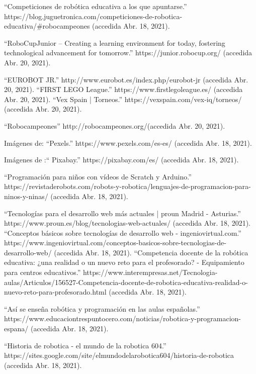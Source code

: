 \begin{thebibliography}{69}
	``Competiciones de robótica educativa a los que apuntarse.” https://blog.juguetronica.com/competiciones-de-robotica-educativa/\#robocampeones (accedida Abr. 18, 2021).

 ``RoboCupJunior – Creating a learning environment for today, fostering technological advancement for tomorrow.” https://junior.robocup.org/ (accedida Abr. 20, 2021).

	``EUROBOT JR.” http://www.eurobot.es/index.php/eurobot-jr (accedida Abr. 20, 2021).
 ``FIRST LEGO League.” https://www.firstlegoleague.es/ (accedida Abr. 20, 2021).
 ``Vex Spain | Torneos.” https://vexspain.com/vex-iq/torneos/ (accedida Abr. 20, 2021).

 ``Robocampeones”
http://robocampeones.org/(accedida Abr. 20, 2021).

 Imágenes de:	``Pexels.” https://www.pexels.com/es-es/ (accedida Abr. 18, 2021).

 Imágenes de :`` Pixabay.” https://pixabay.com/es/ (accedida Abr. 18, 2021).

\bibitem{}	``Programación para niños con vídeos de Scratch y Arduino.” https://revistaderobots.com/robots-y-robotica/lenguajes-de-programacion-para-ninos-y-ninas/ (accedida Abr. 18, 2021).

\bibitem{}	``Tecnologías para el desarrollo web más actuales | proun Madrid - Asturias.” https://www.proun.es/blog/tecnologias-web-actuales/ (accedida Abr. 18, 2021).
\bibitem{}	``Conceptos básicos sobre tecnologías de desarrollo web - ingeniovirtual.com.” https://www.ingeniovirtual.com/conceptos-basicos-sobre-tecnologias-de-desarrollo-web/ (accedida Abr. 18, 2021).
\bibitem{} ``Competencia docente de la robótica educativa: ¿una realidad o un nuevo reto para el profesorado? - Equipamiento para centros educativos.” https://www.interempresas.net/Tecnologia-aulas/Articulos/156527-Competencia-docente-de-robotica-educativa-realidad-o-nuevo-reto-para-profesorado.html (accedida Abr. 18, 2021).



\bibitem{}	``Así se enseña robótica y programación en las aulas españolas.” https://www.educaciontrespuntocero.com/noticias/robotica-y-programacion-espana/ (accedida Abr. 18, 2021).

 ``Historia de robotica - el mundo de la robotica 604.” https://sites.google.com/site/elmundodelarobotica604/historia-de-robotica (accedida Abr. 18, 2021).


\end{thebibliography}
